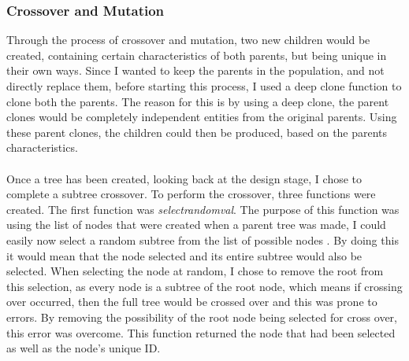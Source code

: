 \documentclass[11pt]{article}
\begin{document}
\subsubsection{Crossover and Mutation}
Through the process of crossover and mutation, two new children would be created, containing certain characteristics of both parents, but being unique in their own ways. Since I wanted to keep the parents in the population, and not directly replace them, before starting this process, I used a deep clone function to clone both the parents. The reason for this is by using a deep clone, the parent clones would be completely independent entities from the original parents. Using these parent clones, the children could then be produced, based on the parents characteristics. \\
\\
Once a tree has been created, looking back at the design stage, I chose to complete a subtree crossover. To perform the crossover, three functions were created. The first function was \textit{select\textunderscore random\textunderscore val}. The purpose of this function was using the list of nodes that were created when a parent tree was made, I could easily now select a random subtree from the list of possible nodes . By doing this it would mean that the node selected and its entire subtree would also be selected. When selecting the node at random, I chose to remove the root from this selection, as every node is a subtree of the root node, which means if crossing over occurred, then the full tree would be crossed over and this was prone to errors. By removing the possibility of the root node being selected for cross over, this error was overcome. This function returned the node that had been selected as well as the node's unique ID. \\
\end{document}
